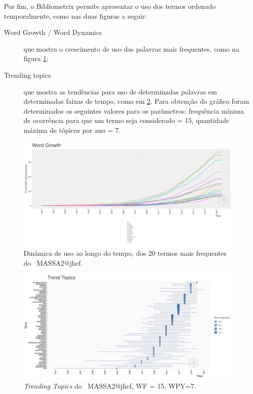 Por fim, o Bibliometrix permite apresentar o uso dos termos ordenado temporalmente, como nas duas figuras a seguir:
\begin{description}
    \item [Word Growth / Word Dynamics] que mostra o crescimento de uso das palavras mais frequentes, como na figura \ref{fig:MASSA2-WordDynamics};
    \item [Trending topics] que mostra as tendências para uso de determinadas palavras em determinadas faixas de tempo, como em \ref{fig:MASSA2-TrendTopics}. Para obtenção do gráfico foram determinados os seguintes valores para os parâmetros: frequência mínima de ocorrência para que um termo seja considerado = 15, quantidade máxima de tópicos por ano = 7.
\end{description}

\begin{figure}
    \centering
    \includegraphics[width=1\textwidth]{experiments/jhcf/PesqBibliogr/SimulacaoMultiagente/WoS-20220203/Metricas/Documentos/MASSA2-WordDynamics.png}
    \caption{Dinâmica de uso ao longo do tempo, dos 20 termos mais frequentes do \dataset\ MASSA2@jhcf.}
    \label{fig:MASSA2-WordDynamics}
\end{figure}

\begin{figure}
    \centering
    \includegraphics[angle=90,width=1\textwidth,height=0.93\textheight]{experiments/jhcf/PesqBibliogr/SimulacaoMultiagente/WoS-20220203/Metricas/Documentos/MASSA2-TrendTopics-WF=15:WPY=7.png}
    \caption{\textit{Trending Topics} do \dataset\ MASSA2@jhcf, WF = 15, WPY=7.}
    \label{fig:MASSA2-TrendTopics}
\end{figure}

